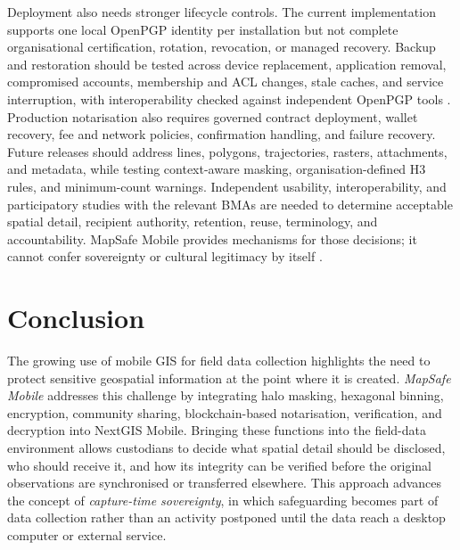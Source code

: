 \documentclass[]{interact}
\begin{document}
Deployment also needs stronger lifecycle controls. The current implementation supports one local OpenPGP identity per installation but not complete organisational certification, rotation, revocation, or managed recovery. Backup and restoration should be tested across device replacement, application removal, compromised accounts, membership and ACL changes, stale caches, and service interruption, with interoperability checked against independent OpenPGP tools \citep{wouters2024openpgp,nextgis2026permissions}. Production notarisation also requires governed contract deployment, wallet recovery, fee and network policies, confirmation handling, and failure recovery. Future releases should address lines, polygons, trajectories, rasters, attachments, and metadata, while testing context-aware masking, organisation-defined H3 rules, and minimum-count warnings. Independent usability, interoperability, and participatory studies with the relevant BMAs are needed to determine acceptable spatial detail, recipient authority, retention, reuse, terminology, and accountability. MapSafe Mobile provides mechanisms for those decisions; it cannot confer sovereignty or cultural legitimacy by itself \citep{kukutai2016indigenous,lovett2019gooddata,carroll2020care,jennings2023care,reyesgarcia2022}.

\section{Conclusion}
\label{sec:conclusion}

The growing use of mobile GIS for field data collection highlights the need to protect sensitive geospatial information at the point where it is created. \textit{MapSafe Mobile} addresses this challenge by integrating halo masking, hexagonal binning, encryption, community sharing, blockchain-based notarisation, verification, and decryption into NextGIS Mobile. Bringing these functions into the field-data environment allows custodians to decide what spatial detail should be disclosed, who should receive it, and how its integrity can be verified before the original observations are synchronised or transferred elsewhere. This approach advances the concept of \emph{capture-time sovereignty}, in which safeguarding becomes part of data collection rather than an activity postponed until the data reach a desktop computer or external service.
\end{document}
